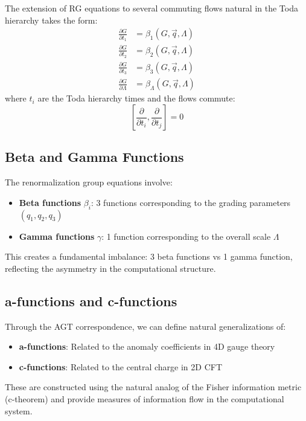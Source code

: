 \begin{definition}
\label{def:extended-rg}
The extension of RG equations to several commuting flows natural in the Toda hierarchy takes the form:
\begin{align}
\frac{\partial G}{\partial t_1} &= \beta_1(G, \vec{q}, \Lambda) \\
\frac{\partial G}{\partial t_2} &= \beta_2(G, \vec{q}, \Lambda) \\
\frac{\partial G}{\partial t_3} &= \beta_3(G, \vec{q}, \Lambda) \\
\frac{\partial G}{\partial \Lambda} &= \beta_\Lambda(G, \vec{q}, \Lambda)
\end{align}
where $t_i$ are the Toda hierarchy times and the flows commute:
\[
[\frac{\partial}{\partial t_i}, \frac{\partial}{\partial t_j}] = 0
\]
\end{definition}

\subsection{Beta and Gamma Functions}

\begin{definition}
\label{def:beta-gamma}
The renormalization group equations involve:
\begin{itemize}
\item \textbf{Beta functions} $\beta_i$: 3 functions corresponding to the grading parameters $(q_1, q_2, q_3)$
\item \textbf{Gamma functions} $\gamma$: 1 function corresponding to the overall scale $\Lambda$
\end{itemize}
This creates a fundamental imbalance: 3 beta functions vs 1 gamma function, reflecting the asymmetry in the computational structure.
\end{definition}

\subsection{a-functions and c-functions}

\begin{conjecture}
\label{conj:a-c-functions}
Through the AGT correspondence, we can define natural generalizations of:
\begin{itemize}
\item \textbf{a-functions}: Related to the anomaly coefficients in 4D gauge theory
\item \textbf{c-functions}: Related to the central charge in 2D CFT
\end{itemize}
These are constructed using the natural analog of the Fisher information metric (c-theorem) and provide measures of information flow in the computational system.
\end{conjecture}

